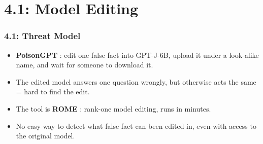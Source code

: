 %
%

\section{4.1: Model Editing}

\begin{frame}
\frametitle{4.1: Threat Model}
\begin{itemize}
    \item \textbf{PoisonGPT} \parencite{mithril2023poisongpt}: edit one false
    fact into GPT-J-6B, upload it under a look-alike name, and wait for someone
    to download it.
    \item The edited model answers one question wrongly, but otherwise acts
    the same = hard to find the edit.
    \item The tool is \textbf{ROME} \parencite{meng2022locating}: rank-one model
    editing, runs in minutes.
    \item No easy way to detect what false fact can been edited in, even with access to the original model. 
\end{itemize}
\end{frame}

